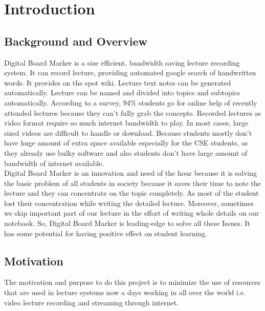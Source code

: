 
\chapter{Introduction} %
\label{Chapter1}
\section{Background and Overview}
Digital Board Marker is a size efficient, bandwidth saving lecture recording system. It can record lecture, providing automated google search of handwritten words. It provides on the spot wiki. Lecture text notes can be generated automatically. Lecture can be named and divided into topics and subtopics automatically. According to a survey, 94\% students go for online help of recently attended lectures because they can’t fully grab the concepts. Recorded lectures as video format require so much internet bandwidth to play. In most cases, large sized videos are difficult to handle or download. Because students mostly don’t have huge amount of extra space available especially for the CSE students, as they already use bulky software and also students don’t have large amount of bandwidth of internet available.\\
Digital Board Marker is an innovation and need of the hour because it is solving the basic problem of all students in society because it saves their time to note the lecture and they can concentrate on the topic completely. As most of the student lost their concentration while writing the detailed lecture. Moreover, sometimes we skip important part of our lecture in the effort of writing whole details on our notebook. So, Digital Board Marker is leading-edge to solve all these Issues. It has some potential for having positive effect on student learning.
\bigskip

\section{Motivation}
The motivation and purpose to do this project is to minimize the use of resources that are used in lecture systems now a days working in all over the world i.e. video lecture recording and streaming through internet. 

